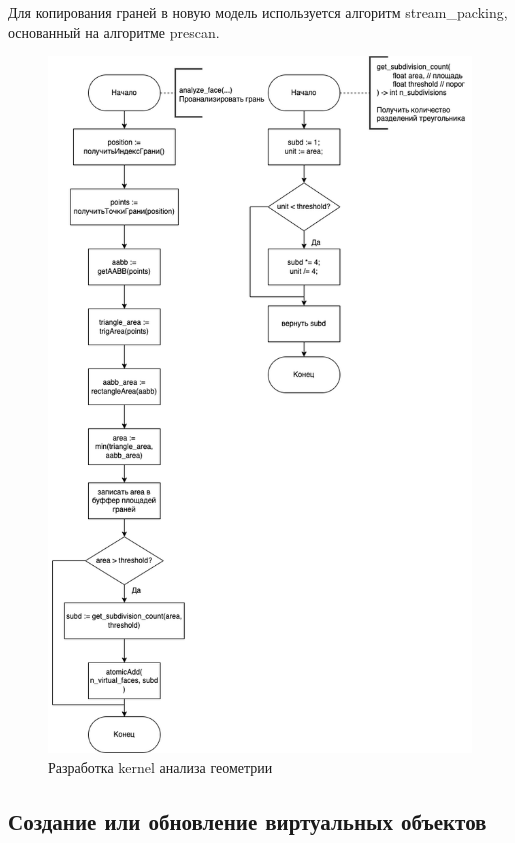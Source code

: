 Для копирования граней в новую модель используется алгоритм \newline stream\_packing, основанный на алгоритме prescan.

\begin{figure}[ph!]
	\centering
	\includegraphics[height=0.95\textheight]{inc/img/diagrams-vgeom_analyzer.drawio.png}
	\caption{Разработка kernel анализа геометрии}
	\label{fig:geom_analyzer_kernel}
\end{figure}

\pagebreak

\subsection{Создание или обновление виртуальных объектов}

